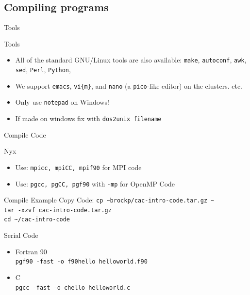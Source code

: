 \documentclass[handout]{beamer}
\begin{document}
  \subsection{Compiling programs}
  \begin{frame}{Tools}
   \begin{block}{Tools}
    \begin{itemize}
    \item<1- > All of the standard GNU/Linux tools are also available: \texttt{make},
      \texttt{autoconf}, \texttt{awk}, \texttt{sed}, \texttt{Perl}, \texttt{Python},
    \item<2- > We support \texttt{emacs}, \texttt{vi\{m\}}, and \texttt{nano} (a 
      \texttt{pico}-like editor) on the clusters.
      etc.
    \item<3-| alert@1-> Only use \texttt{notepad} on Windows!
    \item<3-| alert@1-> If made on windows fix with \texttt{dos2unix filename}
    \end{itemize}
   \end{block}
  \end{frame}
  \begin{frame}{Compile Code}
   \begin{block}{Nyx}
   \begin{itemize}
    \item Use: \texttt{mpicc, mpiCC, mpif90} for MPI code
    \item Use: \texttt{pgcc, pgCC, pgf90} with \texttt{-mp} for OpenMP Code
   \end{itemize}
   \end{block}
  \end{frame}
\begin{frame}{Compile Example}
 Copy Code: \texttt{cp \~{}brockp/cac-intro-code.tar.gz \~{}} 
 \\ \texttt{tar -xzvf cac-intro-code.tar.gz}  \\ \texttt{cd \~{}/cac-intro-code}
 \begin{block}{Serial Code}
  \begin{itemize}
   \item Fortran 90
         \\ \texttt{pgf90 -fast -o f90hello helloworld.f90}
   \item C
         \\ \texttt{pgcc -fast -o chello helloworld.c}
  \end{itemize}
 \end{block}
\end{frame}
\end{document}
